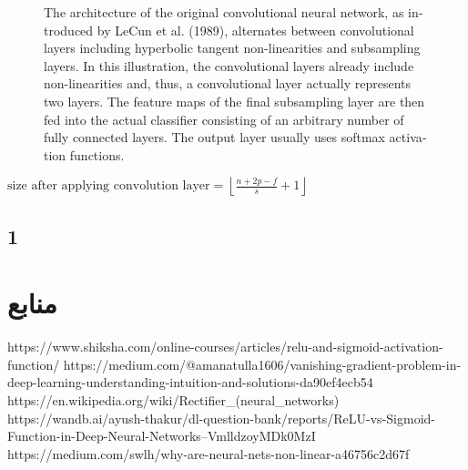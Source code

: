 \documentclass{article}
\begin{document}
\begin{latin}
\begin{figure}[H]
	\caption[Architecture of a traditional convolutional neural network.]{The architecture of the original convolutional neural network, as introduced by LeCun et al. (1989), alternates between convolutional layers including hyperbolic tangent non-linearities and subsampling layers. In this illustration, the convolutional layers already include non-linearities and, thus, a convolutional layer actually represents two layers. The feature maps of the final subsampling layer are then fed into the actual classifier consisting of an arbitrary number of fully connected layers. The output layer usually uses softmax activation functions.}
	\label{fig:traditional-convolutional-network}
\end{figure}

$
\text{size after applying convolution layer} = \left\lfloor \frac{n + 2p - f}{s} + 1 \right\rfloor
$

\subsection{1}


\end{latin}




\section*{منابع}
\renewcommand{\section}[2]{}%
\begin{thebibliography}{99} %


\begin{LTRitems}

\resetlatinfont

 https://www.shiksha.com/online-courses/articles/relu-and-sigmoid-activation-function/
 https://medium.com/@amanatulla1606/vanishing-gradient-problem-in-deep-learning-understanding-intuition-and-solutions-da90ef4ecb54
 https://en.wikipedia.org/wiki/Rectifier\_(neural\_networks)
 https://wandb.ai/ayush-thakur/dl-question-bank/reports/ReLU-vs-Sigmoid-Function-in-Deep-Neural-Networks--VmlldzoyMDk0MzI
 https://medium.com/swlh/why-are-neural-nets-non-linear-a46756c2d67f
\end{LTRitems}

\end{thebibliography}
\end{document}
